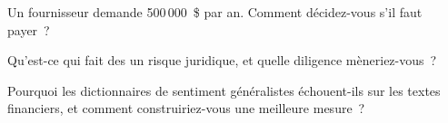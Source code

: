 \begin{interviewq}\label{iq:rs:alternative-and-text-data:4}
Un fournisseur demande 500\,000~\$ par an. Comment décidez-vous s'il faut payer~?
\end{interviewq}

\begin{interviewq}\label{iq:rs:alternative-and-text-data:5}
Qu'est-ce qui fait des  un risque juridique, et quelle diligence mèneriez-vous~?
\end{interviewq}

\begin{interviewq}\label{iq:rs:alternative-and-text-data:6}
Pourquoi les dictionnaires de sentiment généralistes échouent-ils sur les textes financiers, et comment construiriez-vous une meilleure mesure~?
\end{interviewq}

